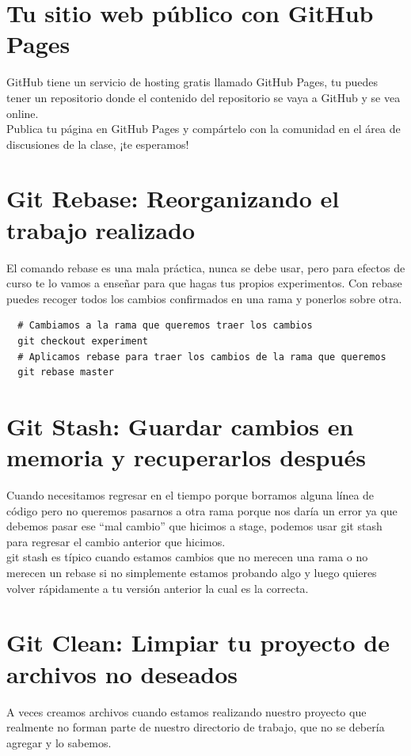 \documentclass{article}
\begin{document}
\section{Tu sitio web público con GitHub Pages}%
GitHub tiene un servicio de hosting gratis llamado GitHub Pages, tu puedes
tener un repositorio donde el contenido del repositorio se vaya a GitHub y se
vea online.\\

Publica tu página en GitHub Pages y compártelo con la comunidad en el área de
discusiones de la clase, ¡te esperamos!


\section{Git Rebase: Reorganizando el trabajo realizado}%
El comando rebase es una mala práctica, nunca se debe usar, pero para efectos
de curso te lo vamos a enseñar para que hagas tus propios experimentos. Con
rebase puedes recoger todos los cambios confirmados en una rama y ponerlos
sobre otra.

\begin{verbatim}
  # Cambiamos a la rama que queremos traer los cambios
  git checkout experiment
  # Aplicamos rebase para traer los cambios de la rama que queremos 
  git rebase master
\end{verbatim}

\section{Git Stash: Guardar cambios en memoria y recuperarlos después}%
Cuando necesitamos regresar en el tiempo porque borramos alguna línea de código
pero no queremos pasarnos a otra rama porque nos daría un error ya que debemos
pasar ese “mal cambio” que hicimos a stage, podemos usar git stash para
regresar el cambio anterior que hicimos.\\

git stash es típico cuando estamos cambios que no merecen una rama o no merecen
un rebase si no simplemente estamos probando algo y luego quieres volver
rápidamente a tu versión anterior la cual es la correcta.

\section{Git Clean: Limpiar tu proyecto de archivos no deseados}%
A veces creamos archivos cuando estamos realizando nuestro proyecto que
realmente no forman parte de nuestro directorio de trabajo, que no se debería
agregar y lo sabemos.\\
\end{document}

